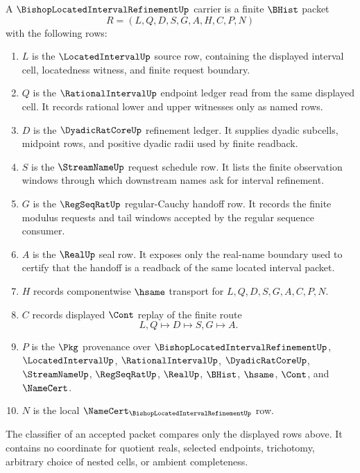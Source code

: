 \begin{definition}
\label{def:bishop-located-interval-refinement-carrier}
A $\BishopLocatedIntervalRefinementUp$ carrier is a finite $\BHist$ packet
$$
R=(L,Q,D,S,G,A,H,C,P,N)
$$
with the following rows:
\begin{enumerate}
\item $L$ is the $\LocatedIntervalUp$ source row, containing the displayed interval cell, locatedness witness, and finite request boundary.
\item $Q$ is the $\RationalIntervalUp$ endpoint ledger read from the same displayed cell. It records rational lower and upper witnesses only as named rows.
\item $D$ is the $\DyadicRatCoreUp$ refinement ledger. It supplies dyadic subcells, midpoint rows, and positive dyadic radii used by finite readback.
\item $S$ is the $\StreamNameUp$ request schedule row. It lists the finite observation windows through which downstream names ask for interval refinement.
\item $G$ is the $\RegSeqRatUp$ regular-Cauchy handoff row. It records the finite modulus requests and tail windows accepted by the regular sequence consumer.
\item $A$ is the $\RealUp$ seal row. It exposes only the real-name boundary used to certify that the handoff is a readback of the same located interval packet.
\item $H$ records componentwise $\hsame$ transport for $L,Q,D,S,G,A,C,P,N$.
\item $C$ records displayed $\Cont$ replay of the finite route
$$
L,Q \longmapsto D \longmapsto S,G \longmapsto A .
$$
\item $P$ is the $\Pkg$ provenance over $\BishopLocatedIntervalRefinementUp$, $\LocatedIntervalUp$, $\RationalIntervalUp$, $\DyadicRatCoreUp$, $\StreamNameUp$, $\RegSeqRatUp$, $\RealUp$, $\BHist$, $\hsame$, $\Cont$, and $\NameCert$.
\item $N$ is the local $\NameCert_{\BishopLocatedIntervalRefinementUp}$ row.
\end{enumerate}
The classifier of an accepted packet compares only the displayed rows above. It contains no coordinate for quotient reals, selected endpoints, trichotomy, arbitrary choice of nested cells, or ambient completeness.
\end{definition}

